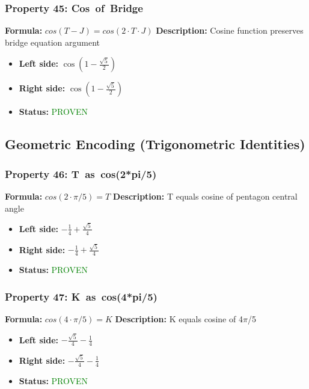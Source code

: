 \subsubsection*{Property 45: Cos~of~Bridge}
\textbf{Formula:} $cos(T-J) = cos(2 \cdot T \cdot J)$
\textbf{Description:} Cosine function preserves bridge equation argument

\begin{itemize}
\item \textbf{Left side:} $\cos{\left(1 - \frac{\sqrt{5}}{2} \right)}$
\item \textbf{Right side:} $\cos{\left(1 - \frac{\sqrt{5}}{2} \right)}$
\item \textbf{Status:} \textcolor{green}{PROVEN}
\end{itemize}


\subsection{Geometric Encoding (Trigonometric Identities)}

\subsubsection*{Property 46: T~as~cos(2*pi/5)}
\textbf{Formula:} $cos(2 \cdot \pi/5) = T$
\textbf{Description:} T equals cosine of pentagon central angle

\begin{itemize}
\item \textbf{Left side:} $- \frac{1}{4} + \frac{\sqrt{5}}{4}$
\item \textbf{Right side:} $- \frac{1}{4} + \frac{\sqrt{5}}{4}$
\item \textbf{Status:} \textcolor{green}{PROVEN}
\end{itemize}

\subsubsection*{Property 47: K~as~cos(4*pi/5)}
\textbf{Formula:} $cos(4 \cdot \pi/5) = K$
\textbf{Description:} K equals cosine of 4$\pi$/5

\begin{itemize}
\item \textbf{Left side:} $- \frac{\sqrt{5}}{4} - \frac{1}{4}$
\item \textbf{Right side:} $- \frac{\sqrt{5}}{4} - \frac{1}{4}$
\item \textbf{Status:} \textcolor{green}{PROVEN}
\end{itemize}

